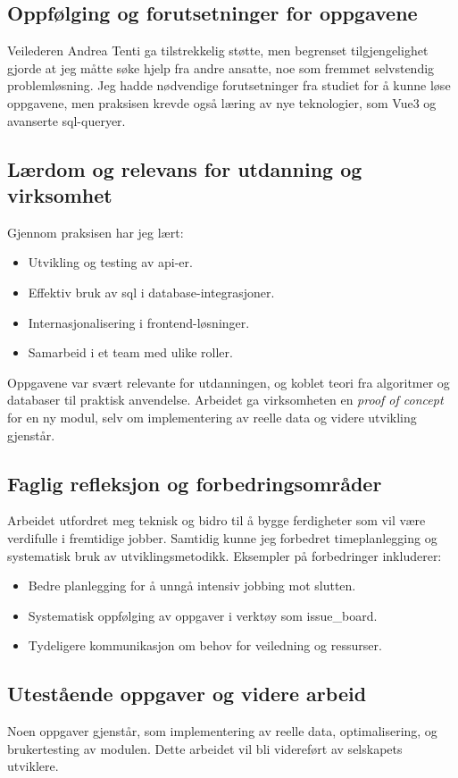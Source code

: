\subsection{Oppfølging og forutsetninger for oppgavene}
Veilederen Andrea Tenti ga tilstrekkelig støtte, men begrenset tilgjengelighet gjorde at jeg måtte søke hjelp fra andre ansatte, noe som fremmet selvstendig problemløsning. Jeg hadde nødvendige forutsetninger fra studiet for å kunne løse oppgavene, men praksisen krevde også læring av nye teknologier, som Vue3 og avanserte \gls{sql}-queryer.

\subsection{Lærdom og relevans for utdanning og virksomhet}
Gjennom praksisen har jeg lært:

\begin{itemize} 
    \item Utvikling og testing av \gls{api}-er. 
    \item Effektiv bruk av \gls{sql} i database-integrasjoner. 
    \item Internasjonalisering i frontend-løsninger. 
    \item Samarbeid i et team med ulike roller. 
\end{itemize}

Oppgavene var svært relevante for utdanningen, og koblet teori fra algoritmer og databaser til praktisk anvendelse. Arbeidet ga virksomheten en \textit{proof of concept} for en ny modul, selv om implementering av reelle data og videre utvikling gjenstår.

\subsection{Faglig refleksjon og forbedringsområder}
Arbeidet utfordret meg teknisk og bidro til å bygge ferdigheter som vil være verdifulle i fremtidige jobber. Samtidig kunne jeg forbedret timeplanlegging og systematisk bruk av utviklingsmetodikk. 
Eksempler på forbedringer inkluderer:
\begin{itemize} 
    \item Bedre planlegging for å unngå intensiv jobbing mot slutten. 
    \item Systematisk oppfølging av oppgaver i verktøy som \gls{issue_board}. 
    \item Tydeligere kommunikasjon om behov for veiledning og ressurser. 
\end{itemize}

\subsection{Utestående oppgaver og videre arbeid}
Noen oppgaver gjenstår, som implementering av reelle data, optimalisering, og brukertesting av modulen. Dette arbeidet vil bli videreført av selskapets utviklere.